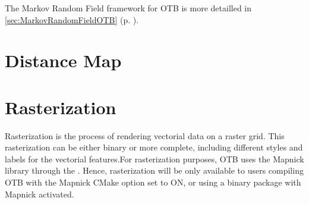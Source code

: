 The Markov Random Field framework for OTB is more detailled in \ref{sec:MarkovRandomFieldOTB} (p. \pageref{sec:MarkovRandomFieldOTB}).

\ifitkFullVersion

\fi

\section{Distance Map}
\label{sec:DistanceMap}

\ifitkFullVersion

\fi


\section{Rasterization}

Rasterization is the process of rendering vectorial data on a raster
grid. This rasterization can be either binary or more complete,
including different styles and labels for the vectorial features.For
rasterization purposes, OTB uses the Mapnick library through the
. Hence, rasterization will be
only available to users compiling OTB with the Mapnick CMake option
set to ON, or using a binary package with Mapnick activated.












